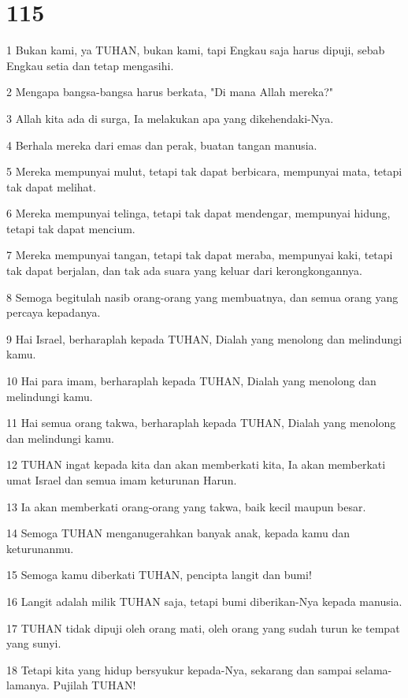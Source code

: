 \chapter{115}

\par 1 Bukan kami, ya TUHAN, bukan kami, tapi Engkau saja harus dipuji, sebab Engkau setia dan tetap mengasihi.
\par 2 Mengapa bangsa-bangsa harus berkata, "Di mana Allah mereka?"
\par 3 Allah kita ada di surga, Ia melakukan apa yang dikehendaki-Nya.
\par 4 Berhala mereka dari emas dan perak, buatan tangan manusia.
\par 5 Mereka mempunyai mulut, tetapi tak dapat berbicara, mempunyai mata, tetapi tak dapat melihat.
\par 6 Mereka mempunyai telinga, tetapi tak dapat mendengar, mempunyai hidung, tetapi tak dapat mencium.
\par 7 Mereka mempunyai tangan, tetapi tak dapat meraba, mempunyai kaki, tetapi tak dapat berjalan, dan tak ada suara yang keluar dari kerongkongannya.
\par 8 Semoga begitulah nasib orang-orang yang membuatnya, dan semua orang yang percaya kepadanya.
\par 9 Hai Israel, berharaplah kepada TUHAN, Dialah yang menolong dan melindungi kamu.
\par 10 Hai para imam, berharaplah kepada TUHAN, Dialah yang menolong dan melindungi kamu.
\par 11 Hai semua orang takwa, berharaplah kepada TUHAN, Dialah yang menolong dan melindungi kamu.
\par 12 TUHAN ingat kepada kita dan akan memberkati kita, Ia akan memberkati umat Israel dan semua imam keturunan Harun.
\par 13 Ia akan memberkati orang-orang yang takwa, baik kecil maupun besar.
\par 14 Semoga TUHAN menganugerahkan banyak anak, kepada kamu dan keturunanmu.
\par 15 Semoga kamu diberkati TUHAN, pencipta langit dan bumi!
\par 16 Langit adalah milik TUHAN saja, tetapi bumi diberikan-Nya kepada manusia.
\par 17 TUHAN tidak dipuji oleh orang mati, oleh orang yang sudah turun ke tempat yang sunyi.
\par 18 Tetapi kita yang hidup bersyukur kepada-Nya, sekarang dan sampai selama-lamanya. Pujilah TUHAN!

